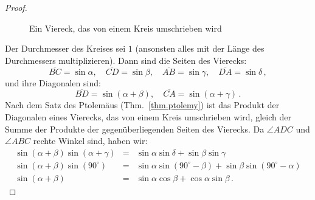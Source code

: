 \begin{proof}
\begin{figure}[t]
\begin{center}
\end{center}
\caption{Ein Viereck, das von einem Kreis umschrieben wird}\label{f.trig-quad-circle}
\end{figure}
Der Durchmesser des Kreises sei $1$ (ansonsten alles mit der Länge des Durchmessers multiplizieren). Dann sind die Seiten des Vierecks:
\[
\overline{BC}=\sin\alpha,\quad \overline{CD}=\sin\beta,\quad \overline{AB}=\sin\gamma,\quad \overline{DA}=\sin\delta\,,
\]
und ihre Diagonalen sind:
\[
\overline{BD}=\sin(\alpha + \beta),\quad \overline{CA}=\sin (\alpha+\gamma)\,.
\]
Nach dem Satz des Ptolemäus (Thm.~\ref{thm.ptolemy}) ist das Produkt der Diagonalen eines Vierecks, das von einem Kreis umschrieben wird, gleich der Summe der Produkte der gegenüberliegenden Seiten des Vierecks. Da $\angle ADC$ und $\angle ABC$ rechte Winkel sind, haben wir:
\[
\renewcommand{\arraystretch}{1.3}
\begin{array}{lcl}
\sin (\alpha+\beta)\sin(\alpha+\gamma)&=&
\sin \alpha \sin\delta + \sin \beta\sin \gamma\\
\sin (\alpha+\beta)\sin(90^\circ)&=&
\sin \alpha \sin(90^\circ-\beta) + \sin \beta\sin (90^\circ-\alpha)\\
\sin (\alpha+\beta)&=&\sin\alpha\cos\beta+\cos\alpha\sin \beta\,.
\end{array}
\]
\end{proof}



